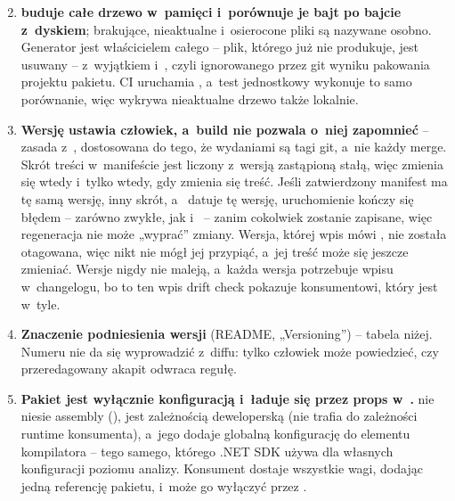 \begin{enumerate}
  \setcounter{enumi}{1}
  \item \textbf{ buduje całe drzewo w~pamięci i~porównuje je
        bajt po bajcie z~dyskiem}; brakujące, nieaktualne i~osierocone pliki są nazywane
        osobno. Generator jest właścicielem całego  -- plik, którego już nie
        produkuje, jest usuwany -- z~wyjątkiem  i~, czyli ignorowanego
        przez git wyniku pakowania projektu pakietu. CI uruchamia , a~test
        jednostkowy wykonuje to samo porównanie, więc  wykrywa
        nieaktualne drzewo także lokalnie.
  \item \textbf{Wersję ustawia człowiek, a~build nie pozwala o~niej zapomnieć} -- zasada
        z~, dostosowana do tego, że wydaniami są tagi git, a~nie
        każdy merge. Skrót treści w~manifeście jest liczony z~wersją zastąpioną stałą, więc
        zmienia się wtedy i~tylko wtedy, gdy zmienia się treść. Jeśli zatwierdzony manifest ma
        tę samą wersję, inny skrót, a~ datuje tę wersję, uruchomienie kończy
        się błędem -- zarówno zwykłe, jak i~ -- zanim cokolwiek zostanie
        zapisane, więc regeneracja nie może „wyprać” zmiany. Wersja, której wpis mówi
        , nie została otagowana, więc nikt nie mógł jej przypiąć, a~jej
        treść może się jeszcze zmieniać. Wersje nigdy nie maleją, a~każda wersja potrzebuje
        wpisu w~changelogu, bo to ten wpis drift check pokazuje konsumentowi, który jest
        w~tyle.
  \item \textbf{Znaczenie podniesienia wersji} (README, „Versioning”) -- tabela niżej. Numeru
        nie da się wyprowadzić z~diffu: tylko człowiek może powiedzieć, czy przeredagowany
        akapit odwraca regułę.
  \item \textbf{Pakiet jest wyłącznie konfiguracją i~ładuje się przez props w~.}
         nie niesie assembly (),
        jest zależnością deweloperską (nie trafia do zależności runtime konsumenta), a~jego
         dodaje globalną konfigurację do elementu
         kompilatora -- tego samego, którego .NET SDK używa dla
        własnych konfiguracji poziomu analizy. Konsument dostaje wszystkie wagi, dodając jedną
        referencję pakietu, i~może go wyłączyć przez
        .

\end{enumerate}
